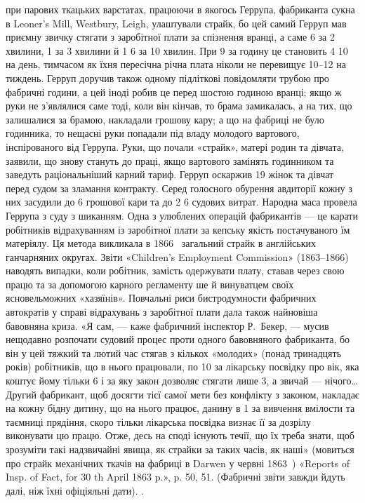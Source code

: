 {при парових ткацьких варстатах, працюючи в якогось Геррупа,
фабриканта сукна в Leoner’s Mill, Westbury, Leigh, улаштували страйк,
бо цей самий Герруп мав приємну звичку стягати з заробітної плати за
спізнення вранці, а саме 6 за 2 хвилини, 1 за 3 хвилини й
1 6 за 10 хвилин. При 9 за годину це становить
4 10 на день, тимчасом як їхня пересічна річна
плата ніколи не перевищує 10--12 на тиждень. Герруп доручив
також одному підліткові повідомляти трубою про фабричні години,
а цей іноді робив це перед шостою годиною вранці; якщо ж руки не з’являлися
саме тоді, коли він кінчав, то брама замикалась, а на тих, що залишалися
за брамою, накладали грошову кару; а що на фабриці не було
годинника, то нещасні руки попадали під владу молодого вартового,
інспірованого від Геррупа. Руки, що почали «страйк», матері родин
та дівчата, заявили, що знову стануть до праці, якщо вартового замінять
годинником та заведуть раціональніший карний тариф. Герруп
оскаржив 19 жінок та дівчат перед судом за зламання контракту. Серед
голосного обурення авдиторії кожну з них засудили до 6 грошової
кари та до 2 6 судових витрат. Народна маса провела
Геррупа з суду з шиканням. Одна з улюблених операцій фабрикантів
— це карати робітників відрахуванням із заробітної плати за
кепську якість постачуваного їм матеріялу. Ця метода викликала в 1866~
загальний страйк в англійських ганчарняних округах. Звіти «Children’s
Employment Commission» (1863--1866) наводять випадки, коли робітник,
замість одержувати плату, ставав через свою працю та за допомогою
карного регламенту ше й винуватцем своїх ясновельможних «хазяїнів».
Повчальні риси бистродумности фабричних автократів у справі відрахувань
з заробітної плати дала також найновіша бавовняна криза.
«Я сам, — каже фабричний інспектор Р.~Бекер, — мусив нещодавно розпочати
судовий процес проти одного бавовняного фабриканта, бо він у цей тяжкий
та лютий час стягав з кількох «молодих» (понад тринадцять років)
робітників, що в нього працювали, по 10 за лікарську посвідку
про вік, яка коштує йому тільки 6 і за яку закон дозволяє стягати
лише 3, а звичай — нічого\dots{} Другий фабрикант, щоб досягти
тієї самої мети без конфлікту з законом, накладає на кожну бідну дитину,
що на нього працює, данину в 1 за вивчення вмілости та
таємниці прядіння, скоро тільки лікарська посвідка визнає її за дозрілу
виконувати цю працю. Отже, десь на споді існують течії, що їх треба знати,
щоб зрозуміти такі надзвичайні явища, як страйки за таких часів, як
наші» (мовиться про страйк механічних ткачів на фабриці в Darwen у
червні 1863~) «Reports of Insp. of Fact, for 30 th April 1863 p.», p. 50,
51. (Фабричні звіти завжди йдуть далі, ніж їхні офіціяльні дати).
}.

